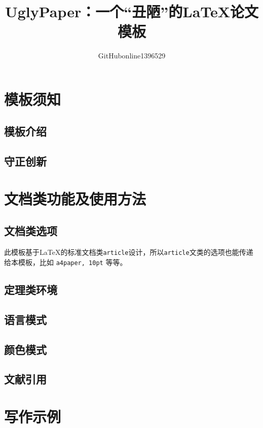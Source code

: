 \documentclass[10pt, twocolumn, compact, crimson]{uglypaper}
\title{\bfseries UglyPaper：一个“丑陋”的\LaTeX{}论文模板}
\author{GitHubonline1396529}
\date{\zhdate{2022/12/31}}
\begin{document}

\section{模板须知}
\subsection{模板介绍}


\subsection{守正创新}


\section{文档类功能及使用方法}
\subsection{文档类选项}\label{ssec:classoptions}

此模板基于\LaTeX{}的标准文档类\texttt{article}设计，所以\texttt{article}文类的选项也能传递给本模板，比如 \texttt{a4paper, 10pt} 等等。



\subsection{定理类环境}


\subsection{语言模式}


\subsection{颜色模式}\label{ssec:colors}


\subsection{文献引用}


\section{写作示例}



\printbibliography[
  title=\ebibname]

\appendix
\addappheadtotoc
\end{document}
